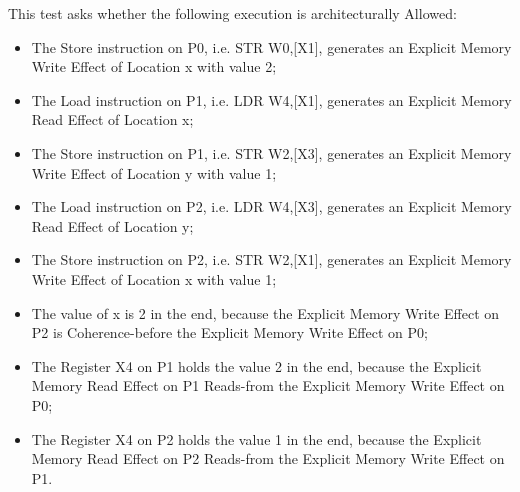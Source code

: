 This test asks whether the following execution is architecturally Allowed:

\begin{itemize}
  \item The Store instruction on P0, i.e. STR W0,[X1], generates an Explicit Memory Write Effect of Location x with value 2;
  \item The Load instruction on P1, i.e. LDR W4,[X1], generates an Explicit Memory Read Effect of Location x;
  \item The Store instruction on P1, i.e. STR W2,[X3], generates an Explicit Memory Write Effect of Location y with value 1;
  \item The Load instruction on P2, i.e. LDR W4,[X3], generates an Explicit Memory Read Effect of Location y;
  \item The Store instruction on P2, i.e. STR W2,[X1], generates an Explicit Memory Write Effect of Location x with value 1;
  \item The value of x is 2 in the end, because the Explicit Memory Write Effect on P2 is Coherence-before the Explicit Memory Write Effect on P0;
  \item The Register X4 on P1 holds the value 2 in the end, because the Explicit Memory Read Effect on P1 Reads-from the Explicit Memory Write Effect on P0;
  \item The Register X4 on P2 holds the value 1 in the end, because the Explicit Memory Read Effect on P2 Reads-from the Explicit Memory Write Effect on P1.
\end{itemize}
